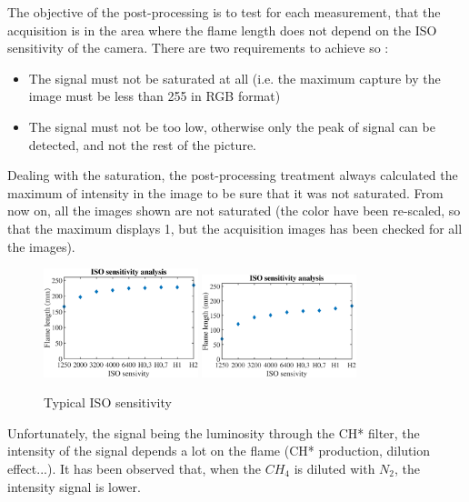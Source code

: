 The objective of the post-processing is to test for each measurement, that the acquisition is in the area where the flame length does not depend on the ISO sensitivity of the camera. There are two requirements to achieve so :
\begin{itemize}
\item The signal must not be saturated at all (i.e. the maximum capture by the image must be less than 255 in RGB format)
\item The signal must not be too low, otherwise only the peak of signal can be detected, and not the rest of the picture.
\end{itemize}
Dealing with the saturation, the post-processing treatment always calculated the maximum of intensity in the image to be sure that it was not saturated. From now on, all the images shown are not saturated (the color have been re-scaled, so that the maximum displays 1, but the acquisition images has been checked for all the images).
\begin{figure}[!h]
  \centering
\includegraphics[width=0.4\textwidth]{fig/sensitivity/ISO_sensivity_analysis_4069.eps}
\includegraphics[width=0.4\textwidth]{fig/sensitivity/ISO_sensivity_analysis_4476.eps}
  \caption{Typical ISO sensitivity}
 \label{fig_Iso_sensitivity}
\end{figure}
Unfortunately, the signal being the luminosity through the CH* filter, the intensity of the signal depends a lot on the flame (CH* production, dilution effect...). It has been observed that, when the $CH_{4}$ is diluted with $N_{2}$, the intensity signal is lower.
